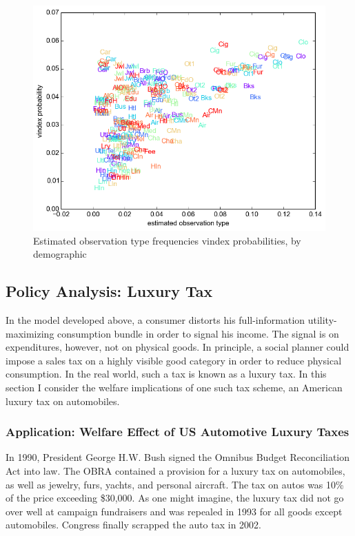 \documentclass[12pt]{article}
\begin{document}
\begin{figure}
    \centering
	\includegraphics[scale=.8]{pics/obs_vin_scat.png}
    \caption{Estimated observation type frequencies vindex probabilities, by demographic}
    \label{fig:vinmatch}
\end{figure}

\subsection{Policy Analysis: Luxury Tax}

In the model developed above, a consumer distorts his full-information utility-maximizing consumption bundle in order to signal his income.  The signal is on expenditures, however, not on physical goods.  In principle, a social planner could impose a sales tax on a highly visible good category in order to reduce physical consumption.  In the real world, such a tax is known as a luxury tax.  In this section I consider the welfare implications of one such tax scheme, an American luxury tax on automobiles.

\subsubsection{Application: Welfare Effect of US Automotive Luxury Taxes}

In 1990, President George H.W. Bush signed the Omnibus Budget Reconciliation Act into law.\footnotemark{}  The OBRA contained a provision for a luxury tax on automobiles, as well as jewelry, furs, yachts, and personal aircraft.  The tax on autos was 10\% of the price exceeding \$30,000.  As one might imagine, the luxury tax did not go over well at campaign fundraisers and was repealed in 1993 for all goods except automobiles.\footnotemark{}  Congress finally scrapped the auto tax in 2002.
\end{document}
